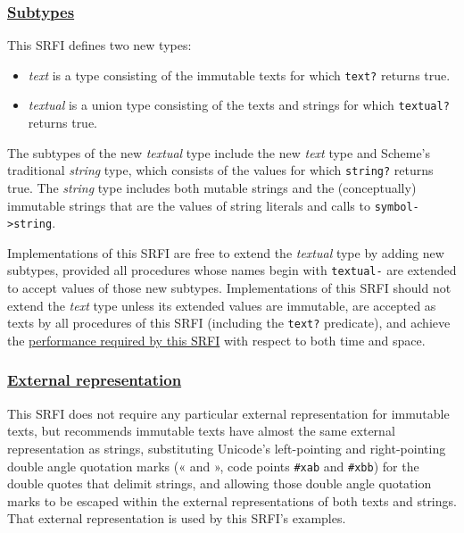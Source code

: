 \subsubsection{\texorpdfstring{\href{}{Subtypes}}{Subtypes}}\label{subtypes}

This SRFI defines two new types:

\begin{itemize}
\tightlist
\item
  \emph{text} is a type consisting of the immutable texts for which
  \texttt{text?} returns true.
\item
  \emph{textual} is a union type consisting of the texts and strings for
  which \texttt{textual?} returns true.
\end{itemize}

The subtypes of the new \emph{textual} type include the new \emph{text}
type and Scheme's traditional \emph{string} type, which consists of the
values for which \texttt{string?} returns true. The \emph{string} type
includes both mutable strings and the (conceptually) immutable strings
that are the values of string literals and calls to
\texttt{symbol-\textgreater{}string}.

Implementations of this SRFI are free to extend the \emph{textual} type
by adding new subtypes, provided all procedures whose names begin with
\texttt{textual-} are extended to accept values of those new subtypes.
Implementations of this SRFI should not extend the \emph{text} type
unless its extended values are immutable, are accepted as texts by all
procedures of this SRFI (including the \texttt{text?} predicate), and
achieve the \protect\hyperlink{PerformanceRequirements}{performance
required by this SRFI} with respect to both time and space.

\subsubsection{\texorpdfstring{\href{}{External
representation}}{External representation}}\label{external-representation}

This SRFI does not require any particular external representation for
immutable texts, but recommends immutable texts have almost the same
external representation as strings, substituting Unicode's left-pointing
and right-pointing double angle quotation marks (« and », code points
\texttt{\#xab} and \texttt{\#xbb}) for the double quotes that delimit
strings, and allowing those double angle quotation marks to be escaped
within the external representations of both texts and strings. That
external representation is used by this SRFI's examples.


